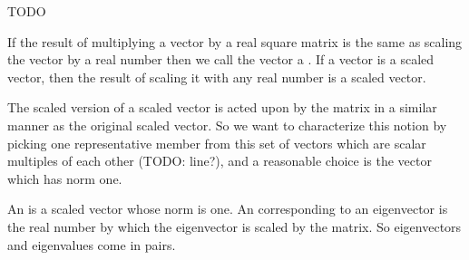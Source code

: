 
\sbasic



































\sstart
{}


TODO


If the result of multiplying a vector by a real square matrix is the same as scaling the vector by a real number then we call the vector a .
If a vector is a scaled vector, then the result of scaling it with any real number is a scaled vector.

The scaled version of a scaled vector is acted upon by the matrix in a similar manner as the original scaled vector.
So we want to characterize this notion by picking one representative member from this set of vectors which are scalar multiples of each other (TODO: line?), and a reasonable choice is the vector which has norm one.

An  is a scaled vector whose norm is one.
An  corresponding to an eigenvector is the real number by which the eigenvector is scaled by the matrix.
So eigenvectors and eigenvalues come in pairs.
\strats
